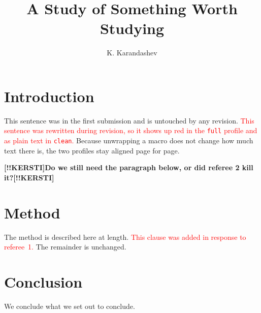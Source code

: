 \documentclass[12pt]{article}
\title{A Study of Something Worth Studying}
\author{K. Karandashev}
\newcommand{\revised}[1]{\textcolor{red}{#1}}
\newcommand{\collaboratorcomment}[1]{\textbf{[!!KERSTI]#1[!!KERSTI]}}
\begin{document}
\maketitle

\section{Introduction}

This sentence was in the first submission and is untouched by any revision.
\revised{This sentence was rewritten during revision, so it shows up red in the
\texttt{full} profile and as plain text in \texttt{clean}.}
Because unwrapping a macro does not change how much text there is, the two
profiles stay aligned page for page.

\collaboratorcomment{Do we still need the paragraph below, or did referee 2
kill it?}

\section{Method}

The method is described here at length. \revised{This clause was added in
response to referee~1.} The remainder is unchanged.

\section{Conclusion}

We conclude what we set out to conclude.
\end{document}
